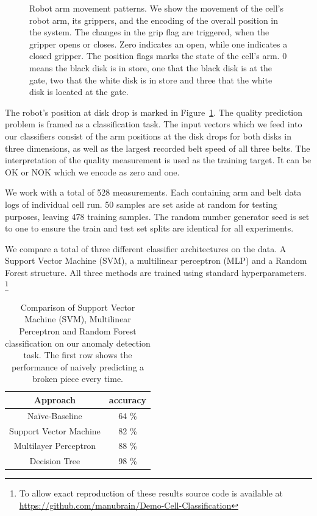 \documentclass[5p,times,procedia]{elsarticle}
\begin{document}
\begin{figure}
       
       \caption{Robot arm movement patterns. We show the movement of the 
                cell's robot arm, its grippers, and the encoding of the overall
                position in the system. The changes in the grip flag are triggered,
                when the gripper opens or closes. Zero indicates an open, while
                one indicates a closed gripper. The position flags marks the state
                of the cell's arm. 0 means the black disk is in store,
                one that the black disk is at the gate, two that the white disk
                is in store and three that the white disk is located at the gate.
             }
\label{fig:robot_pos_cell}
\end{figure}

The robot's position at disk drop is marked in 
Figure~\ref{fig:robot_pos_cell}. The quality prediction problem is 
framed as a classification task. The input vectors which we feed into our
classifiers consist of the arm positions at the disk drops for both
disks in three dimensions, as well as the largest recorded belt speed
of all three belts. The interpretation of the quality measurement is 
used as the training target. It can be OK or NOK which we encode as 
zero and one.

We work with a total of 528 measurements. Each containing arm and belt data
logs of individual cell run. 50 samples are set aside at random for testing 
purposes, leaving 478 training samples. The random number generator seed is
set to one to ensure the train and test set splits are identical 
for all experiments.

We compare a total of three different classifier architectures on the data.
A Support Vector Machine (SVM), a multilinear perceptron (MLP) and a Random Forest
structure. All three methods are trained using standard hyperparameters.
\footnote{To allow exact reproduction of these results source
code is available at \url{https://github.com/manubrain/Demo-Cell-Classification}}

\begin{table}
       \centering
       \begin{tabular}{ c c } \toprule
              Approach         & accuracy \\ \midrule
              Na\"ive-Baseline & 64 \% \\
              Support Vector Machine & 82 \% \\
              Multilayer Perceptron & 88 \% \\
              Decision Tree         & 98 \% \\ \bottomrule
       \end{tabular}
       \caption{Comparison of Support Vector Machine (SVM), Multilinear Perceptron and 
                Random Forest classification on our anomaly detection task. 
                The first row shows the performance of naively predicting a broken piece
                every time.}
       \label{tab:class_comp}
\end{table}
\end{document}
